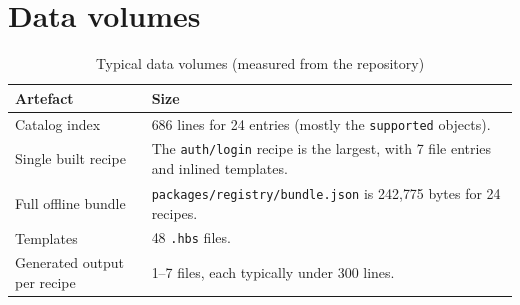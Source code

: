 \section{Data volumes}

\begin{table}[H]
\centering
\caption{Typical data volumes (measured from the repository)}
\begin{tabular}{p{5cm}p{9.2cm}}
\toprule
\textbf{Artefact} & \textbf{Size} \\
\midrule
Catalog index & 686 lines for 24 entries (mostly the \texttt{supported} objects). \\
Single built recipe & The \texttt{auth/login} recipe is the largest, with 7 file entries and inlined templates. \\
Full offline bundle & \texttt{packages/registry/bundle.json} is 242{,}775 bytes for 24 recipes. \\
Templates & 48 \texttt{.hbs} files. \\
Generated output per recipe & 1--7 files, each typically under 300 lines. \\
\bottomrule
\end{tabular}
\end{table}

